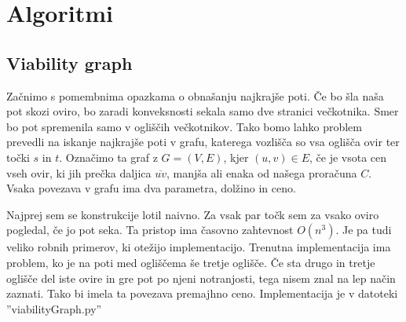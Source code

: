 \documentclass{article}
\begin{document}

\section*{Algoritmi}

\subsection*{Viability graph}

Začnimo s pomembnima opazkama o obnašanju najkrajše poti. Če bo šla naša pot skozi oviro, bo zaradi konveksnosti sekala samo dve stranici večkotnika. Smer bo pot spremenila samo v ogliščih večkotnikov. Tako bomo lahko problem prevedli na iskanje najkrajše poti v grafu, katerega vozlišča so vsa oglišča ovir ter točki $s$ in $t$. Označimo ta graf z $G = (V, E)$, kjer $(u,v) \in E$, če je vsota cen vseh ovir, ki jih prečka daljica $\overline{uv}$, manjša ali enaka od našega proračuna $C$. Vsaka povezava v grafu ima dva parametra, dolžino in ceno. 

Najprej sem se konstrukcije lotil naivno. Za vsak par točk sem za vsako oviro pogledal, če jo pot seka. Ta pristop ima časovno zahtevnost $O(n^3)$. Je pa tudi veliko robnih primerov, ki otežijo implementacijo. Trenutna implementacija ima problem, ko je na poti med ogliščema še tretje oglišče. Če sta drugo in tretje oglišče del iste ovire in gre pot po njeni notranjosti, tega nisem znal na lep način zaznati. Tako bi imela ta povezava premajhno ceno. Implementacija je v datoteki ''viabilityGraph.py''
\end{document}
